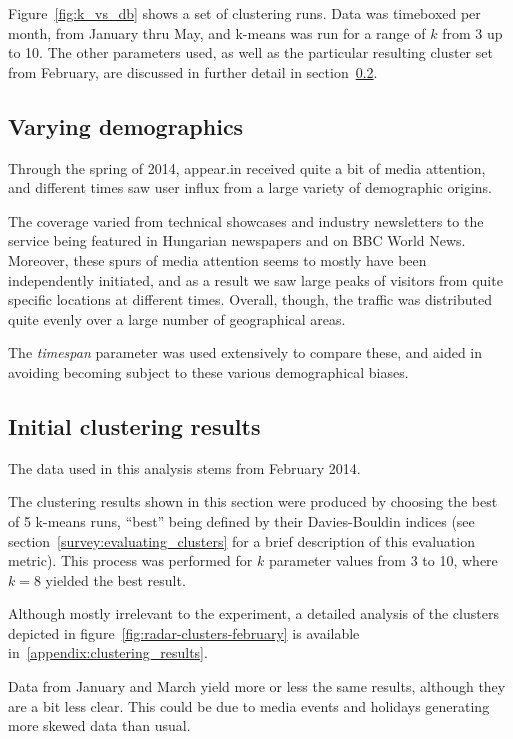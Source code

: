 Figure~\ref{fig:k_vs_db} shows a set of clustering runs. Data was timeboxed per month, from January thru May, and k-means was run for a range of $k$ from 3 up to 10. The other parameters used, as well as the particular resulting cluster set from February, are discussed in further detail in section~\ref{eval:sec:clustering_results}.

\subsection{Varying demographics}
\label{eval:sub:varying_demographics}

Through the spring of 2014, appear.in received quite a bit of media attention, and different times saw user influx from a large variety of demographic origins.

The coverage varied from technical showcases and industry newsletters to the service being featured in Hungarian newspapers and on BBC World News. Moreover, these spurs of media attention seems to mostly have been independently initiated, and as a result we saw large peaks of visitors from quite specific locations at different times. Overall, though, the traffic was distributed quite evenly over a large number of geographical areas.

The \emph{timespan} parameter was used extensively to compare these, and aided in avoiding becoming subject to these various demographical biases.

\subsection{Initial clustering results}
\label{eval:sec:clustering_results}

The data used in this analysis stems from February 2014.

The clustering results shown in this section were produced by choosing the best of 5 k-means runs, ``best'' being defined by their Davies-Bouldin indices (see section~\ref{survey:evaluating_clusters} for a brief description of this evaluation metric). This process was performed for $k$ parameter values from 3 to 10, where $k = 8$ yielded the best result.

Although mostly irrelevant to the experiment, a detailed analysis of the clusters depicted in figure~\ref{fig:radar-clusters-february} is available in~\ref{appendix:clustering_results}.

Data from January and March yield more or less the same results, although they are a bit less clear. This could be due to media events and holidays generating more skewed data than usual.

